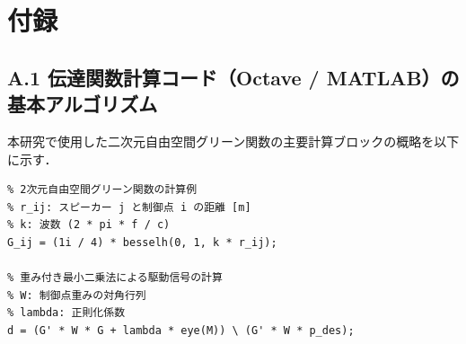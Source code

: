 \documentclass[11pt, a4paper]{article}
\begin{document}
\section*{付録}
\subsection*{A.1 伝達関数計算コード（Octave / MATLAB）の基本アルゴリズム}
本研究で使用した二次元自由空間グリーン関数の主要計算ブロックの概略を以下に示す．

\begin{verbatim}
% 2次元自由空間グリーン関数の計算例
% r_ij: スピーカー j と制御点 i の距離 [m]
% k: 波数 (2 * pi * f / c)
G_ij = (1i / 4) * besselh(0, 1, k * r_ij);

% 重み付き最小二乗法による駆動信号の計算
% W: 制御点重みの対角行列
% lambda: 正則化係数
d = (G' * W * G + lambda * eye(M)) \ (G' * W * p_des);
\end{verbatim}
\end{document}
